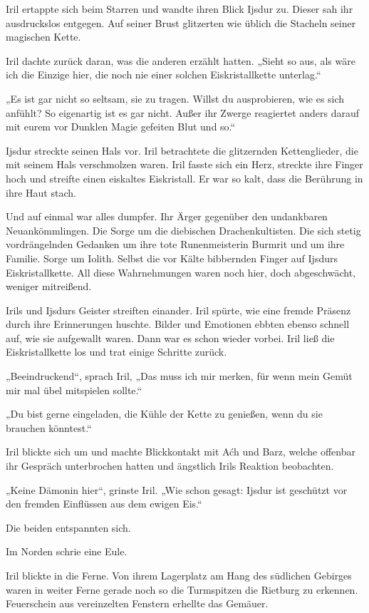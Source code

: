 Iril ertappte sich beim Starren und wandte ihren Blick Ijsdur zu. Dieser sah ihr ausdruckslos entgegen. Auf seiner Brust glitzerten wie üblich die Stacheln seiner magischen Kette.

Iril dachte zurück daran, was die anderen erzählt hatten. „Sieht so aus, als wäre ich die Einzige hier, die noch nie einer solchen Eiskristallkette unterlag.“

„Es ist gar nicht so seltsam, sie zu tragen. Willst du ausprobieren, wie es sich anfühlt? So eigenartig ist es gar nicht. Außer ihr Zwerge reagiertet anders darauf mit eurem vor Dunklen Magie gefeiten Blut und so.“

Ijsdur streckte seinen Hals vor. Iril betrachtete die glitzernden Kettenglieder, die mit seinem Hals verschmolzen waren. Iril fasste sich ein Herz, streckte ihre Finger hoch und streifte einen eiskaltes Eiskristall. Er war so kalt, dass die Berührung in ihre Haut stach.

Und auf einmal war alles dumpfer. Ihr Ärger gegenüber den undankbaren Neuankömmlingen. Die Sorge um die diebischen Drachenkultisten. Die sich stetig vordrängelnden Gedanken um ihre tote Runenmeisterin Burmrit und um ihre Familie. Sorge um Iolith. Selbst die vor Kälte bibbernden Finger auf Ijsdurs Eiskristallkette. All diese Wahrnehmungen waren noch hier, doch abgeschwächt, weniger mitreißend.

Irils und Ijsdurs Geister streiften einander. Iril spürte, wie eine fremde Präsenz durch ihre Erinnerungen huschte. Bilder und Emotionen ebbten ebenso schnell auf, wie sie aufgewallt waren. Dann war es schon wieder vorbei. Iril ließ die Eiskristallkette los und trat einige Schritte zurück.

„Beeindruckend“, sprach Iril, „Das muss ich mir merken, für wenn mein Gemüt mir mal übel mitspielen sollte.“

„Du bist gerne eingeladen, die Kühle der Kette zu genießen, wenn du sie brauchen könntest.“

Iril blickte sich um und machte Blickkontakt mit Aćh und Barz, welche offenbar ihr Gespräch unterbrochen hatten und ängstlich Irils Reaktion beobachten.

„Keine Dämonin hier“, grinste Iril. „Wie schon gesagt: Ijsdur ist geschützt vor den fremden Einflüssen aus dem ewigen Eis.“

Die beiden entspannten sich.

Im Norden schrie eine Eule.

Iril blickte in die Ferne. Von ihrem Lagerplatz am Hang des südlichen Gebirges waren in weiter Ferne gerade noch so die Turmspitzen die Rietburg zu erkennen. Feuerschein aus vereinzelten Fenstern erhellte das Gemäuer.

